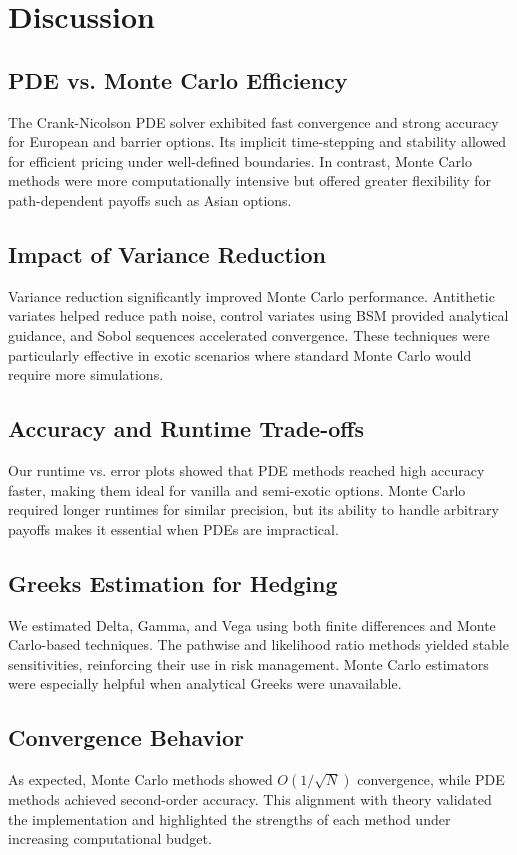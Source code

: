 \documentclass[12pt,a4paper]{article}
\begin{document}
\section{Discussion}

\subsection{PDE vs. Monte Carlo Efficiency}
The Crank-Nicolson PDE solver exhibited fast convergence and strong accuracy for European and barrier options. Its implicit time-stepping and stability allowed for efficient pricing under well-defined boundaries. In contrast, Monte Carlo methods were more computationally intensive but offered greater flexibility for path-dependent payoffs such as Asian options.

\subsection{Impact of Variance Reduction}
Variance reduction significantly improved Monte Carlo performance. Antithetic variates helped reduce path noise, control variates using BSM provided analytical guidance, and Sobol sequences accelerated convergence. These techniques were particularly effective in exotic scenarios where standard Monte Carlo would require more simulations.

\subsection{Accuracy and Runtime Trade-offs}
Our runtime vs. error plots showed that PDE methods reached high accuracy faster, making them ideal for vanilla and semi-exotic options. Monte Carlo required longer runtimes for similar precision, but its ability to handle arbitrary payoffs makes it essential when PDEs are impractical.

\subsection{Greeks Estimation for Hedging}
We estimated Delta, Gamma, and Vega using both finite differences and Monte Carlo-based techniques. The pathwise and likelihood ratio methods yielded stable sensitivities, reinforcing their use in risk management. Monte Carlo estimators were especially helpful when analytical Greeks were unavailable.

\subsection{Convergence Behavior}
As expected, Monte Carlo methods showed \( O(1/\sqrt{N}) \) convergence, while PDE methods achieved second-order accuracy. This alignment with theory validated the implementation and highlighted the strengths of each method under increasing computational budget.
\end{document}
